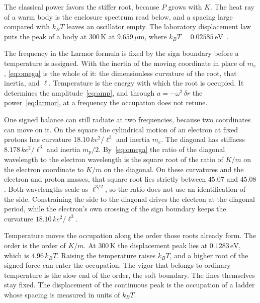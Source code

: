 \documentclass[a4paper]{article}
\begin{document}
The classical power favors the stiffer root, because \(P\) grows with \(K\). The heat ray of a warm body is the enclosure spectrum read below, and a spacing large compared with \(k_B T\) leaves an oscillator empty. The laboratory displacement law puts the peak of a body at \(300\,\mathrm{K}\) at \(9.659\,\mu\mathrm{m}\), where \(k_B T=0.02585\,\mathrm{eV}\)~\cite{codata2018}.

The frequency in the Larmor formula is fixed by the sign boundary before a temperature is assigned. With the inertia of the moving coordinate in place of \(m_e\), \eqref{eq:omega} is the whole of it: the dimensionless curvature of the root, that inertia, and \(\ell\). Temperature is the energy with which the root is occupied. It determines the amplitude~\eqref{eq:amp}, and through \(a=-\omega^{2}\,\delta r\) the power~\eqref{eq:larmor}, at a frequency the occupation does not retune.

One signed balance can still radiate at two frequencies, because two coordinates can move on it. On the square the cylindrical motion of an electron at fixed protons has curvature \(18.10\,k e^{2}/\ell^{3}\) and inertia \(m_e\). The diagonal has stiffness \(8.178\,k e^{2}/\ell^{3}\) and inertia \(m_p/2\). By~\eqref{eq:omega} the ratio of the diagonal wavelength to the electron wavelength is the square root of the ratio of \(K/m\) on the electron coordinate to \(K/m\) on the diagonal. On these curvatures and the electron and proton masses, that square root lies strictly between \(45.07\) and \(45.08\). Both wavelengths scale as \(\ell^{3/2}\), so the ratio does not use an identification of the side. Constraining the side to the diagonal drives the electron at the diagonal period, while the electron's own crossing of the sign boundary keeps the curvature \(18.10\,k e^{2}/\ell^{3}\).

Temperature moves the occupation along the order those roots already form. The order is the order of \(K/m\). At \(300\,\mathrm{K}\) the displacement peak lies at \(0.1283\,\mathrm{eV}\), which is \(4.96\,k_B T\). Raising the temperature raises \(k_B T\), and a higher root of the signed force can enter the occupation. The vigor that belongs to ordinary temperature is the slow end of the order, the soft boundary. The lines themselves stay fixed. The displacement of the continuous peak is the occupation of a ladder whose spacing is measured in units of \(k_B T\).
\end{document}
